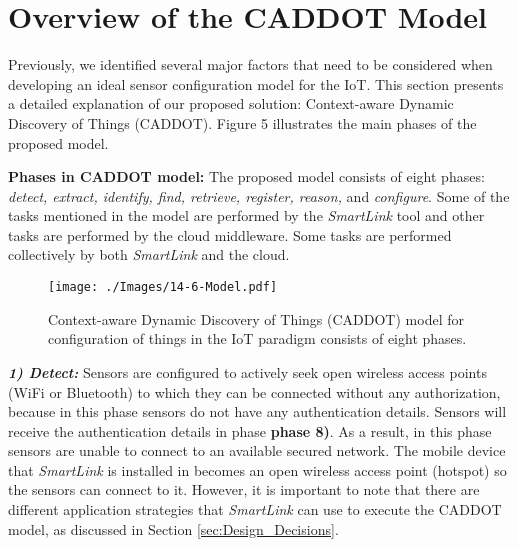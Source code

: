 \documentclass[graybox]{svmult}
\begin{document}
\section{Overview of the CADDOT Model}
\label{sec:Architectural_Design}


Previously, we identified several major factors that need to be considered when developing an ideal sensor configuration model for the IoT. This section presents a detailed explanation of our proposed solution: Context-aware Dynamic Discovery of Things (CADDOT). Figure 5 illustrates the main phases of the proposed model.




\textbf{Phases in CADDOT model:} The proposed model consists of eight phases: \textit{detect, extract, identify, find, retrieve, register, reason,} and \textit{configure}.  Some of the tasks mentioned in the model are performed by the \textit{SmartLink} tool and other tasks are performed by the cloud middleware. Some tasks are performed collectively by both \textit{SmartLink} and the cloud.


 


\begin{figure}[h]
 \centering
\texttt{[image: ./Images/14-6-Model.pdf]}
\caption{Context-aware Dynamic Discovery of Things (CADDOT) model for configuration of things in the IoT paradigm consists of eight phases.}
 \label{Figure:Model}
\end{figure}

\textit{\textbf{1) Detect:}} Sensors are configured to actively seek open wireless access points (WiFi or Bluetooth) to which they can be connected without any authorization, because in this phase sensors do not have any authentication details. Sensors will receive the authentication details in phase \textbf{phase 8)}. As a result, in this phase sensors are unable to connect to an available secured network. The mobile device that \textit{SmartLink} is installed in becomes an open wireless access point (hotspot) so the sensors can connect to it. However, it is important to note that there are different application strategies that \textit{SmartLink} can use to execute the CADDOT model, as discussed in Section \ref{sec:Design_Decisions}.
\end{document}
